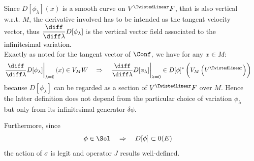 \documentclass[a4paper,12pt,fleqn]{scrartcl}  %
\begin{document}
\vspace{5mm}
Since $D[\phi_\lambda](x)$ is a smooth curve on $ V^\TwistedLinear F $, that is also vertical w.r.t. $M$, 
the derivative involved has to be intended as the tangent velocity vector,
thus $\dfrac{\diff}{\diff \lambda} D [\phi_\lambda]$ is the vertical vector field associated to the infinitesimal variation.\\
Exactly as noted for the tangent vector of $\Conf$, we have for any $x\in M$:
		\begin{displaymath}
			\left.\dfrac{\diff}{\diff \lambda} D [\phi_\lambda]\right\rvert_{\lambda=0}(x) \in V_M W
			\quad \Rightarrow \quad
			\left.\dfrac{\diff}{\diff \lambda} D [\phi_\lambda]\right\rvert_{\lambda=0} \in D[\phi]^\ast \left( V_M \left( V^\TwistedLinear \right)\right)
		\end{displaymath}
		because $D[\phi_\lambda]$ can be regarded as a section of $V^\TwistedLinear F$ over $M$.
		Hence the latter definition does not depend from the particular choice of variation $\phi_\lambda$ 
		but only from its infinitesimal generator $\delta\phi$.

Furthermore, since
\begin{displaymath}
	\phi \in \Sol \quad \Rightarrow \quad D[\phi] \subset 0(E)
\end{displaymath}
the action of $\sigma$ is legit and operator $J$ results well-defined.
%
\end{document}

